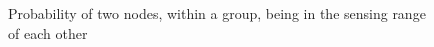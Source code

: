 
\begin{figure}
  \centering
  \caption{Probability of two nodes, within a group, being in the sensing range of each other}
  \label{fig:probabilities}
\end{figure}



